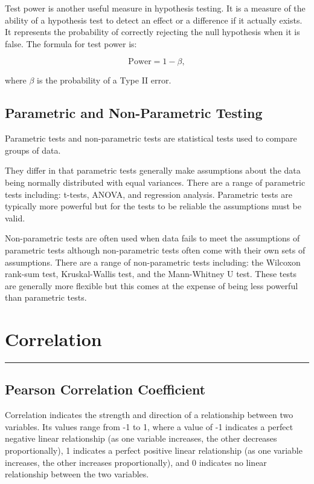 \documentclass[
]{book}
\begin{document}
Test power is another useful measure in hypothesis testing. It is a measure of the ability of a hypothesis test to detect an effect or a difference if it actually exists. It represents the probability of correctly rejecting the null hypothesis when it is false. The formula for test power is:

\[\textrm{Power}= 1-\beta,\]

where \(\beta\) is the probability of a Type II error.

\hypertarget{nonpara}{%
\section{Parametric and Non-Parametric Testing}\label{nonpara}}

Parametric tests and non-parametric tests are statistical tests used to compare groups of data.

They differ in that parametric tests generally make assumptions about the data being normally distributed with equal variances. There are a range of parametric tests including: t-tests, ANOVA, and regression analysis. Parametric tests are typically more powerful but for the tests to be reliable the assumptions must be valid.

Non-parametric tests are often used when data fails to meet the assumptions of parametric tests although non-parametric tests often come with their own sets of assumptions. There are a range of non-parametric tests including: the Wilcoxon rank-sum test, Kruskal-Wallis test, and the Mann-Whitney U test. These tests are generally more flexible but this comes at the expense of being less powerful than parametric tests.

\hypertarget{correlationchapter}{%
\chapter{Correlation}\label{correlationchapter}}

\begin{center}\rule{0.5\linewidth}{0.5pt}\end{center}

\hypertarget{pearson-correlation-coefficient}{%
\section{Pearson Correlation Coefficient}\label{pearson-correlation-coefficient}}

Correlation indicates the strength and direction of a relationship between two variables. Its values range from -1 to 1, where a value of -1 indicates a perfect negative linear relationship (as one variable increases, the other decreases proportionally), 1 indicates a perfect positive linear relationship (as one variable increases, the other increases proportionally), and 0 indicates no linear relationship between the two variables.
\end{document}
